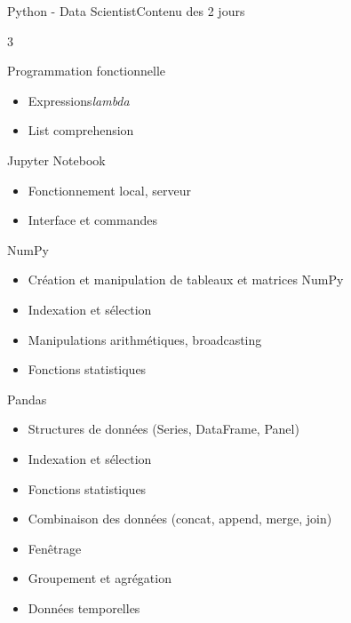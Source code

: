 \documentclass{beamer}
\begin{document}
    \begin{frame}{Python - Data Scientist}{Contenu des 2 jours}
        \begin{tiny}
            \begin{multicols}{3}
                \begin{itemize}
                {\tiny
                \item Programmation fonctionnelle
                    \begin{itemize}
                        \tiny
                        \item Expressions\textit{lambda}
                        \item List comprehension
                    \end{itemize}

                    \item Jupyter Notebook
                    \begin{itemize}
                        \tiny
                        \item Fonctionnement local, serveur
                        \item Interface et commandes
                    \end{itemize}

                    \item NumPy
                    \begin{itemize}
                        \tiny
                        \item Création et manipulation de tableaux et matrices NumPy
                        \item Indexation et sélection
                        \item Manipulations arithmétiques, broadcasting
                        \item Fonctions statistiques
                    \end{itemize}

                    \item Pandas
                    \begin{itemize}
                        \tiny
                        \item Structures de données (Series, DataFrame, Panel)
                        \item Indexation et sélection
                        \item Fonctions statistiques
                        \item Combinaison des données (concat, append, merge, join)
                        \item Fenêtrage
                        \item Groupement et agrégation
                        \item Données temporelles
                    \end{itemize}

}
\end{itemize}
\end{multicols}
\end{tiny}
\end{frame}
\end{document}
